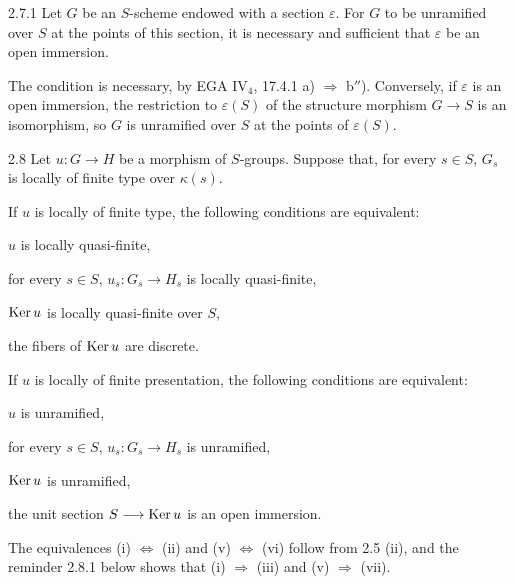 \begin{lemma}{2.7.1}\label{VIB.2.7.1}
Let $G$ be an $S$-scheme endowed with a section $\varepsilon$. For $G$ to be unramified over $S$ at the points of this section, it is necessary and sufficient that $\varepsilon$ be an open immersion.
\end{lemma}
The condition is necessary, by EGA IV$_4$, 17.4.1 a) $\Rightarrow$ b$''$). Conversely, if $\varepsilon$ is an open immersion, the restriction to $\varepsilon(S)$ of the structure morphism $G\to S$ is an isomorphism, so $G$ is unramified over $S$ at the points of $\varepsilon(S)$.
\begin{corollary}{2.8}\label{VIB.2.8}
Let $u:G\to H$ be a morphism of $S$-groups. Suppose that, for every $s\in S$, $G_s$ is locally of finite type over $\kappa(s)$.
\begin{enumeratea}
\item If $u$ is locally of finite type, the following conditions are equivalent:
\begin{enumeratei}
\item $u$ is locally quasi-finite,
\item for every $s\in S$, $u_s:G_s\to H_s$ is locally quasi-finite,
\item $\operatorname{Ker} u$ is locally quasi-finite over $S$,
\item the fibers of $\operatorname{Ker} u$ are discrete.
\end{enumeratei}
\item If $u$ is locally of finite presentation, the following conditions are equivalent:
\begin{enumeratei}\setcounter{enumii}{4}
\item $u$ is unramified,
\item for every $s\in S$, $u_s:G_s\to H_s$ is unramified,
\item $\operatorname{Ker} u$ is unramified,
\item the unit section $S\longrightarrow\operatorname{Ker} u$ is an open immersion.
\end{enumeratei}
\end{enumeratea}
\end{corollary}
The equivalences (i) $\Leftrightarrow$ (ii) and (v) $\Leftrightarrow$ (vi) follow from 2.5 (ii), and the reminder 2.8.1 below shows that (i) $\Rightarrow$ (iii) and (v) $\Rightarrow$ (vii).

